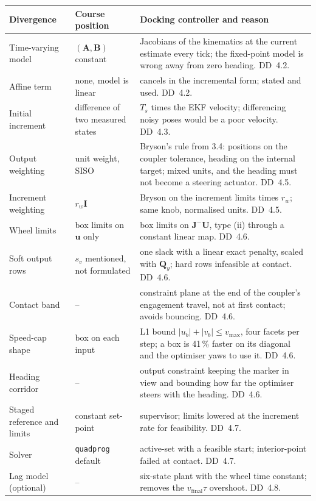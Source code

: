 \documentclass[11pt,a4paper]{article}
\newcommand{\vect}[1]{\bm{#1}}
\newcommand{\mat}[1]{\bm{#1}}
\newcommand{\Ts}{T_s}
\begin{document}
\begin{center}
\small
\renewcommand{\arraystretch}{1.2}
\begin{tabularx}{\linewidth}{>{\raggedright\arraybackslash}p{3.1cm} X X}
\toprule
Divergence & Course position & Docking controller and reason \\
\midrule
Time-varying model & $(\mat A, \mat B)$ constant & Jacobians of the kinematics at the current estimate every tick; the fixed-point model is wrong away from zero heading. DD~4.2. \\
Affine term & none, model is linear & cancels in the incremental form; stated and used. DD~4.2. \\
Initial increment & difference of two measured states & $\Ts$ times the EKF velocity; differencing noisy poses would be a poor velocity. DD~4.3. \\
Output weighting & unit weight, SISO & Bryson's rule from 3.4: positions on the coupler tolerance, heading on the internal target; mixed units, and the heading must not become a steering actuator. DD~4.5. \\
Increment weighting & $r_w\mat I$ & Bryson on the increment limits times $r_w$; same knob, normalised units. DD~4.5. \\
Wheel limits & box limits on $\vect u$ only & box limits on $\mat J^{-}\vect U$, type (ii) through a constant linear map. DD~4.6. \\
Soft output rows & $s_v$ mentioned, not formulated & one slack with a linear exact penalty, scaled with $\mat Q_y$; hard rows infeasible at contact. DD~4.6. \\
Contact band & -- & constraint plane at the end of the coupler's engagement travel, not at first contact; avoids bouncing. DD~4.6. \\
Speed-cap shape & box on each input & L1 bound $|u_b|+|v_b|\le v_{\max}$, four facets per step; a box is 41\,\% faster on its diagonal and the optimiser yaws to use it. DD~4.6. \\
Heading corridor & -- & output constraint keeping the marker in view and bounding how far the optimiser steers with the heading. DD~4.6. \\
Staged reference and limits & constant set-point & supervisor; limits lowered at the increment rate for feasibility. DD~4.7. \\
Solver & \texttt{quadprog} default & active-set with a feasible start; interior-point failed at contact. DD~4.7. \\
Lag model (optional) & -- & six-state plant with the wheel time constant; removes the $v_{\mathrm{final}}\tau$ overshoot. DD~4.8. \\
\bottomrule
\end{tabularx}
\end{center}
\end{document}
